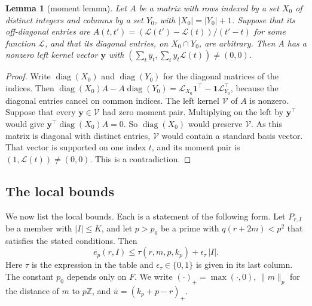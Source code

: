 \documentclass[11pt]{amsart}
\newtheorem{lemma}[theorem]{Lemma}
\theoremstyle{definition}
\theoremstyle{remark}
\numberwithin{equation}{section}
\newcommand{\Z}{\mathbb Z}
\begin{document}
\begin{lemma}[moment lemma]\label{lem:moment}
Let $A$ be a matrix with rows indexed by a set $X_0$ of distinct integers and columns by a set $Y_0$, with
$|X_0|=|Y_0|+1$. Suppose that its off-diagonal entries are $A(t,t')=(\mathcal L(t')-\mathcal L(t))/(t'-t)$ for some
function $\mathcal L$, and that its diagonal entries, on $X_0\cap Y_0$, are arbitrary. Then $A$ has a nonzero left kernel
vector $\mathbf y$ with $(\sum_ty_t,\sum_ty_t\mathcal L(t))\ne(0,0)$.
\end{lemma}
\begin{proof}
Write $\operatorname{diag}(X_0)$ and $\operatorname{diag}(Y_0)$ for the diagonal matrices of the indices. Then
$\operatorname{diag}(X_0)A-A\operatorname{diag}(Y_0)=\mathcal L_{X_0}\mathbf 1^{\top}-\mathbf 1\mathcal L_{Y_0}^{\top}$,
because the diagonal entries cancel on common indices. The left kernel $\mathcal V$ of $A$ is nonzero. Suppose that
every $\mathbf y\in\mathcal V$ had zero moment pair. Multiplying on the left by $\mathbf y^{\top}$ would give
$\mathbf y^{\top}\operatorname{diag}(X_0)A=0$. So $\operatorname{diag}(X_0)$ would preserve $\mathcal V$. As this matrix
is diagonal with distinct entries, $\mathcal V$ would contain a standard basis vector. That vector is supported on one
index $t$, and its moment pair is $(1,\mathcal L(t))\ne(0,0)$. This is a contradiction.
\end{proof}

\subsection{The local bounds}
We now list the local bounds. Each is a statement of the following form. Let $P_{r,I}$ be a member with $|I|\le K$, and
let $p>p_0$ be a prime with $q(r+2m)<p^2$ that satisfies the stated conditions. Then
\begin{equation}\label{eq:localform}
 e_p(r,I)\le\tau(r,m,p,k_p)+\epsilon_\tau\,|I| .
\end{equation}
Here $\tau$ is the expression in the table and $\epsilon_\tau\in\{0,1\}$ is given in its last column. The
constant $p_0$ depends only on $F$. We write $(\cdot)_+=\max(\cdot,0)$, $\|m\|_p$ for the distance of $m$ to
$p\Z$, and $\bar u=(k_p+p-r)_+$.
\end{document}
